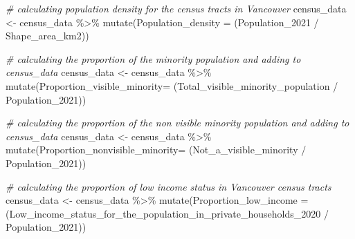 \documentclass[
]{article}
\newenvironment{Shaded}{\begin{snugshade}}{\end{snugshade}}
\newcommand{\AttributeTok}[1]{\textcolor[rgb]{0.77,0.63,0.00}{#1}}
\newcommand{\CommentTok}[1]{\textcolor[rgb]{0.56,0.35,0.01}{\textit{#1}}}
\newcommand{\FunctionTok}[1]{\textcolor[rgb]{0.00,0.00,0.00}{#1}}
\newcommand{\NormalTok}[1]{#1}
\newcommand{\OtherTok}[1]{\textcolor[rgb]{0.56,0.35,0.01}{#1}}
\newcommand{\SpecialCharTok}[1]{\textcolor[rgb]{0.00,0.00,0.00}{#1}}
\begin{document}
\begin{Shaded}
\begin{Highlighting}[]
\CommentTok{\# calculating population density for the census tracts in Vancouver}
\NormalTok{census\_data }\OtherTok{\textless{}{-}}\NormalTok{ census\_data }\SpecialCharTok{\%\textgreater{}\%}
  \FunctionTok{mutate}\NormalTok{(}\AttributeTok{Population\_density =}
\NormalTok{           (Population\_2021 }\SpecialCharTok{/}\NormalTok{ Shape\_area\_km2))}
\end{Highlighting}
\end{Shaded}

\begin{Shaded}
\begin{Highlighting}[]
\CommentTok{\# calculating the proportion of the minority population and adding to census\_data}
\NormalTok{census\_data }\OtherTok{\textless{}{-}}\NormalTok{ census\_data }\SpecialCharTok{\%\textgreater{}\%}
  \FunctionTok{mutate}\NormalTok{(}\AttributeTok{Proportion\_visible\_minority=}\NormalTok{ (Total\_visible\_minority\_population }\SpecialCharTok{/}\NormalTok{ Population\_2021))}
\end{Highlighting}
\end{Shaded}

\begin{Shaded}
\begin{Highlighting}[]
\CommentTok{\# calculating the proportion of the non visible minority population and adding to census\_data}
\NormalTok{census\_data }\OtherTok{\textless{}{-}}\NormalTok{ census\_data }\SpecialCharTok{\%\textgreater{}\%}
  \FunctionTok{mutate}\NormalTok{(}\AttributeTok{Proportion\_nonvisible\_minority=}\NormalTok{ (Not\_a\_visible\_minority }\SpecialCharTok{/}\NormalTok{ Population\_2021))}
\end{Highlighting}
\end{Shaded}

\begin{Shaded}
\begin{Highlighting}[]
\CommentTok{\# calculating the proportion of low income status in Vancouver census tracts}
\NormalTok{census\_data }\OtherTok{\textless{}{-}}\NormalTok{ census\_data }\SpecialCharTok{\%\textgreater{}\%}
  \FunctionTok{mutate}\NormalTok{(}\AttributeTok{Proportion\_low\_income =}\NormalTok{ (Low\_income\_status\_for\_the\_population\_in\_private\_households\_2020 }\SpecialCharTok{/}\NormalTok{ Population\_2021))}
\end{Highlighting}
\end{Shaded}
\end{document}
